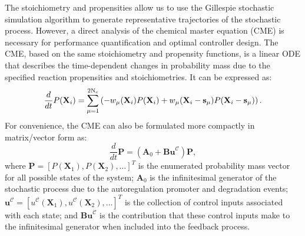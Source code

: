 \documentclass[12pt]{article}
\begin{document}
The stoichiometry and propensities allow us to use the Gillespie stochastic simulation algorithm\cite{Gillespie1992, Gillespie1977} to generate representative trajectories of the stochastic process. However, a direct analysis of the chemical master equation (CME) is necessary for performance quantification and optimal controller design. The CME, based on the same stoichiometry and propensity functions, is a linear ODE that describes the time-dependent changes in probability mass due to the specified reaction propensities and stoichiometries. It can be expressed as:
\begin{equation}
\frac{d}{dt}P(\mathbf{X}_i)=\sum_{\mu=1}^{2{\rm N_c}}
\left(
-w_{\mu}(\mathbf{X}_i)P(\mathbf{X}_i)
+w_{\mu}(\mathbf{X}_i-\mathbf{s}_{\mu})P(\mathbf{X}_i-\mathbf{s}_{\mu})
\right).\label{CMEindex}
\end{equation}
For convenience, the CME can also be formulated more compactly in matrix/vector form as:
\begin{equation}
\frac{d}{dt}\mathbf{P}=(\mathbf{A}_0+\textbf{Bu}^{\mathcal{C}})\mathbf{P},\label{CME}
\end{equation}
where $\mathbf{P} = [P(\mathbf{X}_1), P(\mathbf{X}_2), \ldots ]^T$ is the enumerated probability mass vector for all possible states of the system; $\mathbf{A}_0$ is the infinitesimal generator of the stochastic process due to the autoregulation promoter and degradation events;  $\textbf{u}^{\mathcal{C}} =[u^{\mathcal{C}}(\mathbf{X}_1), u^{\mathcal{C}}(\mathbf{X}_2), \ldots ]^T$ is the collection of control inputs associated with each state; and $\textbf{Bu}^{\mathcal{C}}$ is the contribution that these control inputs make to the infinitesimal generator when included into the feedback process. 
 
\end{document}
